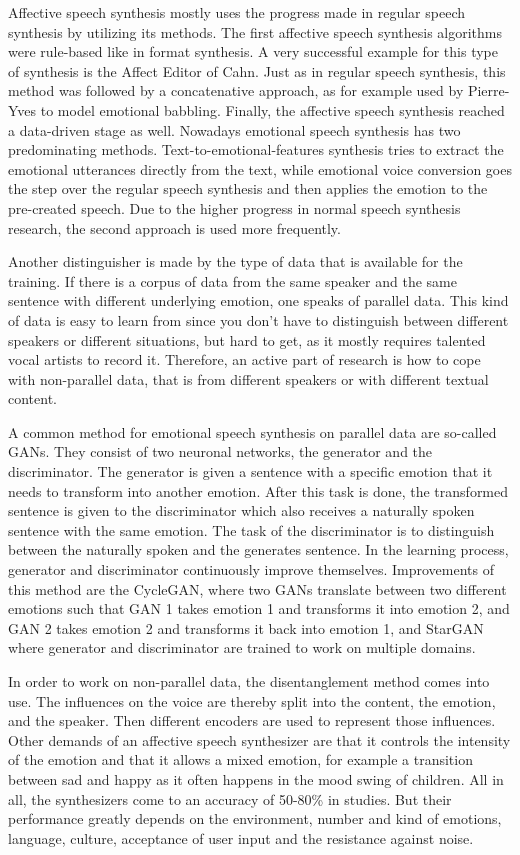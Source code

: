 \documentclass[11pt]{article}
\begin{document}
Affective speech synthesis mostly uses the progress made in regular speech synthesis by utilizing its methods. The first affective speech synthesis algorithms were rule-based like in format synthesis. A very successful example for this type of synthesis is the Affect Editor of Cahn. Just as in regular speech synthesis, this method was followed by a concatenative approach, as for example used by Pierre-Yves to model emotional babbling. Finally, the affective speech synthesis reached a data-driven stage as well.
Nowadays emotional speech synthesis has two predominating methods. Text-to-emotional-features synthesis tries to extract the emotional utterances directly from the text, while emotional voice conversion goes the step over the regular speech synthesis and then applies the emotion to the pre-created speech. Due to the higher progress in normal speech synthesis research, the second approach is used more frequently.

Another distinguisher is made by the type of data that is available for the training. If there is a corpus of data from the same speaker and the same sentence with different underlying emotion, one speaks of parallel data. This kind of data is easy to learn from since you don’t have to distinguish between different speakers or different situations, but hard to get, as it mostly requires talented vocal artists to record it. Therefore, an active part of research is how to cope with non-parallel data, that is from different speakers or with different textual content.

A common method for emotional speech synthesis on parallel data are so-called GANs. They consist of two neuronal networks, the generator and the discriminator. The generator is given a sentence with a specific emotion that it needs to transform into another emotion. After this task is done, the transformed sentence is given to the discriminator which also receives a naturally spoken sentence with the same emotion. The task of the discriminator is to distinguish between the naturally spoken and the generates sentence. In the learning process, generator and discriminator continuously improve themselves. Improvements of this method are the CycleGAN, where two GANs translate between two different emotions such that GAN 1 takes emotion 1 and transforms it into emotion 2, and GAN 2 takes emotion 2 and transforms it back into emotion 1, and StarGAN where generator and discriminator are trained to work on multiple domains.

In order to work on non-parallel data, the disentanglement method comes into use. The influences on the voice are thereby split into the content, the emotion, and the speaker. Then different encoders are used to represent those influences.
Other demands of an affective speech synthesizer are that it controls the intensity of the emotion and that it allows a mixed emotion, for example a transition between sad and happy as it often happens in the mood swing of children. All in all, the synthesizers come to an accuracy of 50-80\% in studies. But their performance greatly depends on the environment, number and kind of emotions, language, culture, acceptance of user input and the resistance against noise.
\end{document}

